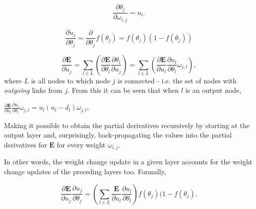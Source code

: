 \begin{equation}\label{delta_theta}
    \frac{\partial \theta_j}{\partial \omega_{i,j}} = u_i.
\end{equation}

\begin{equation}
    \frac{\partial u_j}{\partial \theta_j} = \frac{\partial}{\partial \theta_j} f(\theta_j) = f(\theta_j)(1-f(\theta_j))
\end{equation}

\begin{equation}
    \frac{\partial \textbf{E}}{\partial u_j} = \sum_{l \in L}(\frac{\partial \textbf{E}}{\partial \theta_l} 
    \frac{\partial \theta_l}{\partial u_j})
    = \sum_{l \in L}(\frac{\partial \textbf{E}}{\partial u_l} \frac{\partial u_l}{\partial \theta_l} \omega_{j,l}),
\end{equation}
where $L$ is all nodes to which node $j$ is connected - i.e. the set of nodes with \textit{outgoing} links from $j$. From this it can be seen that when $l$ is an output node,

\begin{center}
\begin{math}
    \frac{\partial \textbf{E}}{\partial u_l} \frac{\partial u_l}{\partial \theta_l} \omega_{j,l} = 
    u_l (u_l - d_l) \omega_{j,l},
\end{math}
\end{center}
Making it possible to obtain the partial derivatives recursively by starting at the output layer and, surprisingly, back-propagating the values into the partial derivatives for $\textbf{E}$ for every weight $\omega_{i,j}$.

In other words, the weight change update in a given layer accounts for the weight change updates of the preceding layers too. Formally,

\begin{equation}\label{recursive_derivative_error_activation_input}
    \frac{\partial \textbf{E}}{\partial u_j}\frac{\partial u_j}{\partial \theta_j} = 
    (\sum_{l \in L}\frac{\textbf{E}}{\partial u_l}\frac{\partial u_l}{\partial \theta_l}) f(\theta_j)(1-f(\theta_j).
\end{equation}


